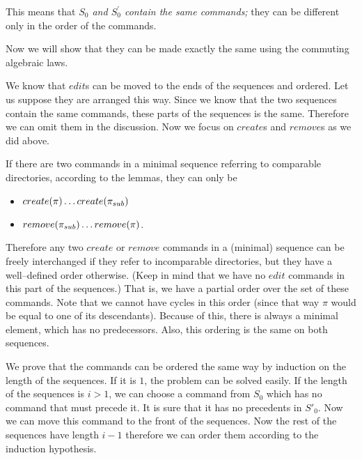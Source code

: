 This means that
\emph{\(S_0\) and \(S^\prime_0\) contain the same commands;} they can be
different only in the order of the commands.

\medskip
Now we will show that they can be made exactly the same using the
commuting algebraic laws. 

We know that \(edit\)s can be moved to the ends of the sequences and
ordered. Let us suppose they are arranged this way.
Since we know that the two sequences contain the same
commands, these parts of the sequences is the same.
Therefore we can omit them in the discussion. Now we focus on
\(create\)s and \(remove\)s as we did above.

If there are two commands in a minimal sequence
referring to comparable directories, according to the lemmas, they
can only be
\begin{itemize}
\item \(create(\pi) \ldots create(\pi_{sub})\)
\item \(remove(\pi_{sub}) \ldots remove(\pi)\).
\end{itemize}

Therefore any two \(create\) or \(remove\) commands in a (minimal)
sequence can be freely interchanged if they refer to incomparable
directories, but they have a well--defined order otherwise. (Keep in
mind that we have no \(edit\) commands in this part of the sequences.)
That is, we have a partial order over the set of these commands. Note
that we cannot have cycles in this order (since that way \(\pi\) would 
be equal to one of its descendants). Because of this, there is always
a minimal element, which has no predecessors. Also, this ordering is the
same on both sequences. 

We prove that the commands can be ordered the same way by induction on the
length of the sequences. If it
is \(1\), the problem can be solved easily. If the length of the sequences
is \(i>1\), we can choose a command from \(S_0\) which has no
command that must precede it.
It is sure that it has no precedents in \(S'_0\). Now we
can move this command to the front of the sequences. Now the rest of
the sequences have length \(i-1\) therefore we can order them according to
the induction hypothesis.

